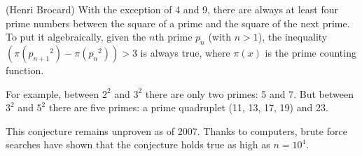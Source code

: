 \documentclass[12pt]{article}
\begin{document}
(Henri Brocard) With the exception of 4 and 9, there are always at least four prime numbers between the square of a prime and the square of the next prime. To put it algebraically, given the $n$th prime $p_n$ (with $n > 1$), the inequality $(\pi({p_{n + 1}}^2) - \pi({p_n}^2)) > 3$ is always true, where $\pi(x)$ is the prime counting function.

For example, between $2^2$ and $3^2$ there are only two primes: 5 and 7. But between $3^2$ and $5^2$ there are five primes: a prime quadruplet (11, 13, 17, 19) and 23.

This conjecture remains unproven as of 2007. Thanks to computers, brute force searches have shown that the conjecture holds true as high as $n = 10^4$. %
\end{document}
